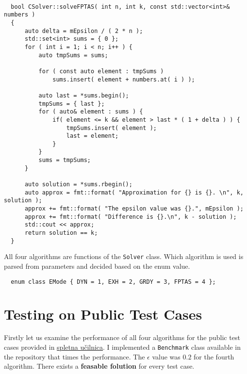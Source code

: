 \documentclass[11pt]{article}
\begin{document}
\begin{verbatim}

  bool CSolver::solveFPTAS( int n, int k, const std::vector<int>& numbers )
  {
      auto delta = mEpsilon / ( 2 * n );
      std::set<int> sums = { 0 };
      for ( int i = 1; i < n; i++ ) {
          auto tmpSums = sums;
  
          for ( const auto element : tmpSums ) 
              sums.insert( element + numbers.at( i ) );
  
          auto last = *sums.begin();
          tmpSums = { last };
          for ( auto& element : sums ) {
              if( element <= k && element > last * ( 1 + delta ) ) {
                  tmpSums.insert( element );
                  last = element;
              }
          }
          sums = tmpSums;
      }
  
      auto solution = *sums.rbegin();
      auto approx = fmt::format( "Approximation for {} is {}. \n", k, solution );
      approx += fmt::format( "The epsilon value was {}.", mEpsilon );
      approx += fmt::format( "Difference is {}.\n", k - solution );
      std::cout << approx;
      return solution == k;
  }  
\end{verbatim}

All four algorithms are functions of the \texttt{Solver} class. Which algorithm is used is parsed from parameters and decided based on the enum value.

\begin{verbatim}
  enum class EMode { DYN = 1, EXH = 2, GRDY = 3, FPTAS = 4 };
\end{verbatim}

\pagebreak

\section{Testing on Public Test Cases}

Firstly let us examine the performance of all four algorithms for the public test cases provided in \href{https://ucilnica.fri.uni-lj.si/mod/assign/view.php?id=32883}{spletna učilnica}. I implemented a \texttt{Benchmark} class available in the repository that times the performance. The $\epsilon$ value was $0.2$ for the fourth algorithm. There exists a \textbf{feasable folution} for every test case. 
\end{document}

